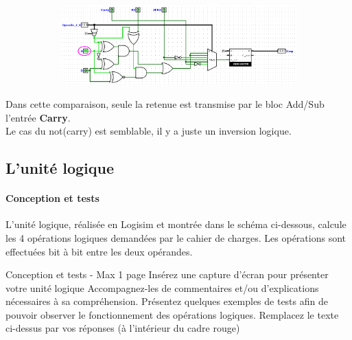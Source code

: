 \documentclass[a4paper]{article}
\begin{document}
\begin{tcolorbox}[colframe=Monokaimagenta,colback=white]
\begin{figure}[H]
   \begin{subfigure}{.7\textwidth}
        \centering
        \includegraphics[width=.8\linewidth]{src/COMP_TEST_AcarB1.png}
        \label{fig:COMPARATEUR_l_EXEMPLE_1}
   \end{subfigure}


\end{figure}

Dans cette comparaison, seule la retenue est  transmise par le bloc Add/Sub l'entrée \textbf{Carry}.\\
Le cas du not(carry) est semblable, il y a juste un inversion logique.

\end{tcolorbox}

\subsection{L'unité logique}
\label{logique}

\paragraph{Conception et tests}
L’unité logique, réalisée en Logisim et montrée dans le schéma ci-dessous, calcule les 4 opérations logiques demandées par le cahier de charges. Les opérations sont effectuées bit à bit entre les deux opérandes.

\begin{tcolorbox}[colframe=Monokaimagenta,colback=white]
Conception et tests - Max 1 page 
Insérez une capture d’écran pour présenter votre unité logique
Accompagnez-les de commentaires et/ou d’explications nécessaires à sa compréhension.
Présentez quelques exemples de tests  afin de pouvoir observer le fonctionnement des opérations logiques.
Remplacez le texte ci-dessus par vos réponses (à l’intérieur du cadre rouge)\\

\end{tcolorbox}
\end{document}
